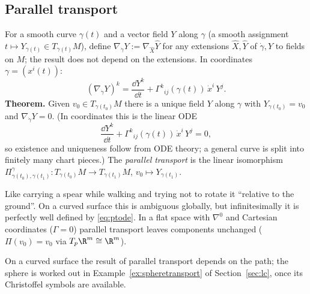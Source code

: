 \subsection{Parallel transport}
\begin{formal}
For a smooth curve $\gamma(t)$ and a vector field $Y$ along $\gamma$ (a smooth assignment $t\mapsto Y_{\gamma(t)}\in T_{\gamma(t)}M$), define $\nabla_{\dot\gamma}Y:=\nabla_{\hat X}\hat Y$ for any extensions $\hat X,\hat Y$ of $\dot\gamma, Y$ to fields on $M$; the result does not depend on the extensions. In coordinates $\gamma=(x^i(t))$:
\[
(\nabla_{\dot\gamma}Y)^k=\frac{\dd Y^k}{\dd t}+\Gamma^k{}_{ij}(\gamma(t))\,\dot x^i\,Y^j .
\]
\textbf{Theorem.} Given $v_0\in T_{\gamma(t_0)}M$ there is a unique field $Y$ along $\gamma$ with $Y_{\gamma(t_0)}=v_0$ and $\nabla_{\dot\gamma}Y=0$. (In coordinates this is the linear ODE
\begin{equation}\label{eq:ptode}
\frac{\dd Y^k}{\dd t}+\Gamma^k{}_{ij}(\gamma(t))\,\dot x^i\,Y^j=0,
\end{equation}
so existence and uniqueness follow from ODE theory; a general curve is split into finitely many chart pieces.) The \emph{parallel transport} is the linear isomorphism $\Pi^\gamma_{\gamma(t_0),\gamma(t_1)}:T_{\gamma(t_0)}M\to T_{\gamma(t_1)}M$, $v_0\mapsto Y_{\gamma(t_1)}$.
\end{formal}
\begin{intuition}
Like carrying a spear while walking and trying not to rotate it ``relative to the ground''. On a curved surface this is ambiguous globally, but infinitesimally it is perfectly well defined by \eqref{eq:ptode}. In a flat space with $\nabla^0$ and Cartesian coordinates ($\Gamma=0$) parallel transport leaves components unchanged ($\Pi(v_0)=v_0$ via $T_p\R^m\cong\R^m$).
\end{intuition}

On a curved surface the result of parallel transport depends on the path; the sphere is worked out in Example~\ref{ex:spheretransport}
of Section~\ref{sec:lc}, once its Christoffel symbols are available.
